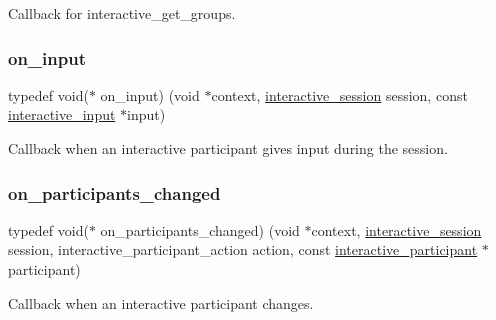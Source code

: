 Callback for {\ttfamily interactive\+\_\+get\+\_\+groups}. 

\mbox{\label{group___interactivity_gabc1d56c93e90e83489bc9200a467a9b6}} 
\subsubsection{\texorpdfstring{on\+\_\+input}{on\_input}}
{\footnotesize\ttfamily typedef void($\ast$ on\+\_\+input) (void $\ast$context, \mbox{\hyperlink{group___interactivity_ga6d8819d38b8dc8994a2299cf22a65a31}{interactive\+\_\+session}} session, const \mbox{\hyperlink{structinteractive__input}{interactive\+\_\+input}} $\ast$input)}



Callback when an interactive participant gives input during the session. 

\mbox{\label{group___interactivity_ga37e53b2d79a8ef8dbb6adae640e53779}} 
\subsubsection{\texorpdfstring{on\+\_\+participants\+\_\+changed}{on\_participants\_changed}}
{\footnotesize\ttfamily typedef void($\ast$ on\+\_\+participants\+\_\+changed) (void $\ast$context, \mbox{\hyperlink{group___interactivity_ga6d8819d38b8dc8994a2299cf22a65a31}{interactive\+\_\+session}} session, interactive\+\_\+participant\+\_\+action action, const \mbox{\hyperlink{structinteractive__participant}{interactive\+\_\+participant}} $\ast$participant)}



Callback when an interactive participant changes. 

\mbox{\label{group___interactivity_ga4f096e039d6692c0be600cf0312540a0}} 

